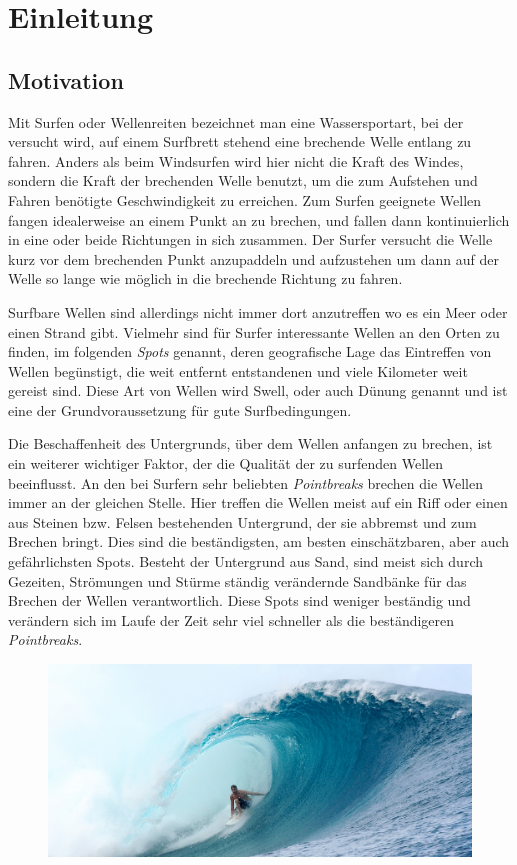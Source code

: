 
\chapter{Einleitung}

\section{Motivation}

Mit Surfen oder Wellenreiten bezeichnet man eine Wassersportart, bei
der versucht wird, auf einem Surfbrett stehend eine brechende Welle
entlang zu fahren. Anders als beim Windsurfen wird hier nicht die
Kraft des Windes, sondern die Kraft der brechenden Welle benutzt, um
die zum Aufstehen und Fahren benötigte Geschwindigkeit zu
erreichen. Zum Surfen geeignete Wellen fangen idealerweise an einem
Punkt an zu brechen, und fallen dann kontinuierlich in eine oder beide
Richtungen in sich zusammen. Der Surfer versucht die Welle kurz vor
dem brechenden Punkt anzupaddeln und aufzustehen um dann auf der Welle
so lange wie möglich in die brechende Richtung zu fahren.

Surfbare Wellen sind allerdings nicht immer dort anzutreffen wo es ein
Meer oder einen Strand gibt. Vielmehr sind für Surfer interessante
Wellen an den Orten zu finden, im folgenden \textit{Spots} genannt,
deren geografische Lage das Eintreffen von Wellen begünstigt, die weit
entfernt entstandenen und viele Kilometer weit gereist sind. Diese Art
von Wellen wird Swell, oder auch Dünung genannt und ist eine der
Grundvoraussetzung für gute Surfbedingungen.

Die Beschaffenheit des Untergrunds, über dem Wellen anfangen zu
brechen, ist ein weiterer wichtiger Faktor, der die Qualität der zu
surfenden Wellen beeinflusst. An den bei Surfern sehr beliebten
\textit{Pointbreaks} brechen die Wellen immer an der gleichen
Stelle. Hier treffen die Wellen meist auf ein Riff oder einen aus
Steinen bzw. Felsen bestehenden Untergrund, der sie abbremst und zum
Brechen bringt. Dies sind die beständigsten, am besten einschätzbaren,
aber auch gefährlichsten Spots. Besteht der Untergrund aus Sand, sind
meist sich durch Gezeiten, Strömungen und Stürme ständig verändernde
Sandbänke für das Brechen der Wellen verantwortlich. Diese Spots sind
weniger beständig und verändern sich im Laufe der Zeit sehr viel
schneller als die beständigeren \textit{Pointbreaks}.

\begin{figure}[h]
  \includegraphics[width=\textwidth]{bilder/intro}
\end{figure}

